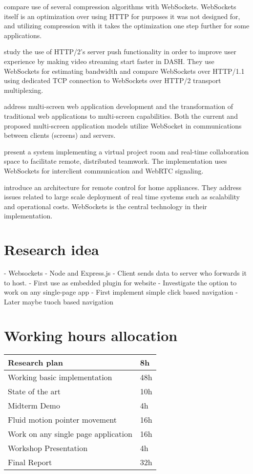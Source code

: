 \documentclass[12pt,a4paper,english,oneside]{article}
\begin{document}
\citet{compression} compare use of several compression algorithms with
WebSockets. WebSockets itself is an optimization over using HTTP for
purposes it was not designed for, and utilizing compression with it
takes the optimization one step further for some applications.

\citet{http2} study the use of HTTP/2's server push functionality in
order to improve user experience by making video streaming start
faster in DASH. They use WebSockets for estimating bandwidth and
compare WebSockets over HTTP/1.1 using dedicated TCP connection to
WebSockets over HTTP/2 transport multiplexing.

\citet{bassbouss} address multi-screen web application development and
the transformation of traditional web applications to multi-screen
capabilities. Both the current and proposed multi-screen application
models utilize WebSocket in communications between clients (screens)
and servers.

\citet{projectrooms} present a system implementing a virtual project
room and real-time collaboration space to facilitate remote,
distributed teamwork. The implementation uses WebSockets for
interclient communication and WebRTC signaling.

\citet{homeappliances} introduce an architecture for remote control for
home appliances. They address issues related to large scale deployment
of real time systems such as scalability and operational
costs. WebSockets is the central technology in their implementation.

\section{Research idea}

- Websockets
- Node and Express.js
- Client sends data to server who forwards it to host.
- First use as embedded plugin for website
- Investigate the option to work on any single-page app
- First implement simple click based navigation
- Later maybe tuoch based navigation


\section{Working hours allocation}

\begin{tabular}{|p{120mm}|p{30mm}|}
  \hline
  Research plan                       & 8h    \\ \hline
  Working basic implementation        & 48h   \\ \hline
  State of the art                    & 10h   \\ \hline
  Midterm Demo                        & 4h    \\ \hline
  Fluid motion pointer movement       & 16h   \\ \hline
  Work on any single page application & 16h   \\ \hline
  Workshop Presentation               & 4h    \\ \hline
  Final Report                        & 32h   \\ \hline
\end{tabular}
\end{document}
